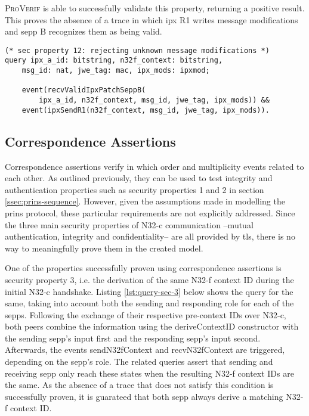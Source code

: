 \textsc{ProVerif} is able to successfully validate this property, returning a positive result.
This proves the absence of a trace in which \gls{ipx} R1 writes message modifications and \gls{sepp} B recognizes them as being valid.

\begin{lstlisting}[caption={Query for security property 12},label={lst:query-sec-12},firstnumber=221]
(* sec property 12: rejecting unknown message modifications *)
query ipx_a_id: bitstring, n32f_context: bitstring,
    msg_id: nat, jwe_tag: mac, ipx_mods: ipxmod;

    event(recvValidIpxPatchSeppB(
        ipx_a_id, n32f_context, msg_id, jwe_tag, ipx_mods)) &&
    event(ipxSendR1(n32f_context, msg_id, jwe_tag, ipx_mods)).
\end{lstlisting}

\subsection{Correspondence Assertions}
\label{ssec:correspondence}

Correspondence assertions verify in which order and multiplicity events related to each other.
As outlined previously, they can be used to test integrity and authentication properties such as security properties 1 and 2 in section \ref{ssec:prins-sequence}.
However, given the assumptions made in modelling the \gls{prins} protocol, these particular requirements are not explicitly addressed.
Since the three main security properties of N32-c communication --mutual authentication, integrity and confidentiality-- are all provided by \gls{tls}, there is no way to meaningfully prove them in the created model.

One of the properties successfully proven using correspondence assertions is security property 3, i.e. the derivation of the same N32-f context ID during the initial N32-c handshake.
Listing \ref{lst:query-sec-3} below shows the query for the same, taking into account both the sending and responding role for each of the \glspl{sepp}.
Following the exchange of their respective pre-context IDs over N32-c, both peers combine the information using the {\sffamily deriveContextID} constructor with the sending \gls{sepp}'s input first and the responding \gls{sepp}'s input second.
Afterwards, the events {\sffamily sendN32fContext} and {\sffamily recvN32fContext} are triggered, depending on the \gls{sepp}'s role.
The related queries assert that sending and receiving \gls{sepp} only reach these states when the resulting N32-f context IDs are the same.
As the absence of a trace that does not satisfy this condition is successfully proven, it is guarateed that both \gls{sepp} always derive a matching N32-f context ID.

